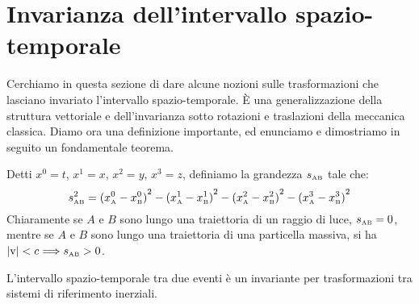 \section{Invarianza dell'intervallo spazio-temporale}
Cerchiamo in questa sezione di dare alcune nozioni sulle
trasformazioni che lasciano invariato l'intervallo
spazio-temporale. \`E una generalizzazione della struttura vettoriale
e dell'invarianza sotto rotazioni e traslazioni della meccanica
classica. Diamo ora una definizione importante, ed enunciamo e
dimostriamo in seguito un fondamentale teorema.
\begin{definizione}
   Detti $x^0 = t$, $x^1=x$,
  $x^2=y$, $x^3 =z $, definiamo la grandezza
  $s_{\mathrm{\scriptscriptstyle AB}}$ tale che:
  \begin{displaymath}
    s_{\mathrm{\scriptscriptstyle AB}}^2 = {(x_{\mathrm{\scriptscriptstyle
          A}}^0 - x_{\mathrm{\scriptscriptstyle B}}^0)}^2 -
    {(x_{\mathrm{\scriptscriptstyle A}}^1 - x_{\mathrm{\scriptscriptstyle
          B}}^1)}^2 - {(x_{\mathrm{\scriptscriptstyle A}}^2 -
      x_{\mathrm{\scriptscriptstyle B}}^2)}^2 -
    {(x_{\mathrm{\scriptscriptstyle A}}^3 - x_{\mathrm{\scriptscriptstyle
          B}}^3)}^2
  \end{displaymath}
  Chiaramente se $A$ e $B$ sono lungo una traiettoria di un raggio di
  luce, $s_{\mathrm{\scriptscriptstyle AB}} = 0$, mentre se $A$ e $B$
  sono lungo una traiettoria di una particella massiva, si ha $|
  \mathbf{ \mathrm{ v } } | < c \Longrightarrow
  s_{\mathrm{\scriptscriptstyle AB}} > 0$.
\end{definizione}
\begin{teorema}
   L'intervallo
  spazio-temporale tra due eventi \`e un invariante per trasformazioni
  tra sistemi di riferimento inerziali.
\end{teorema}
